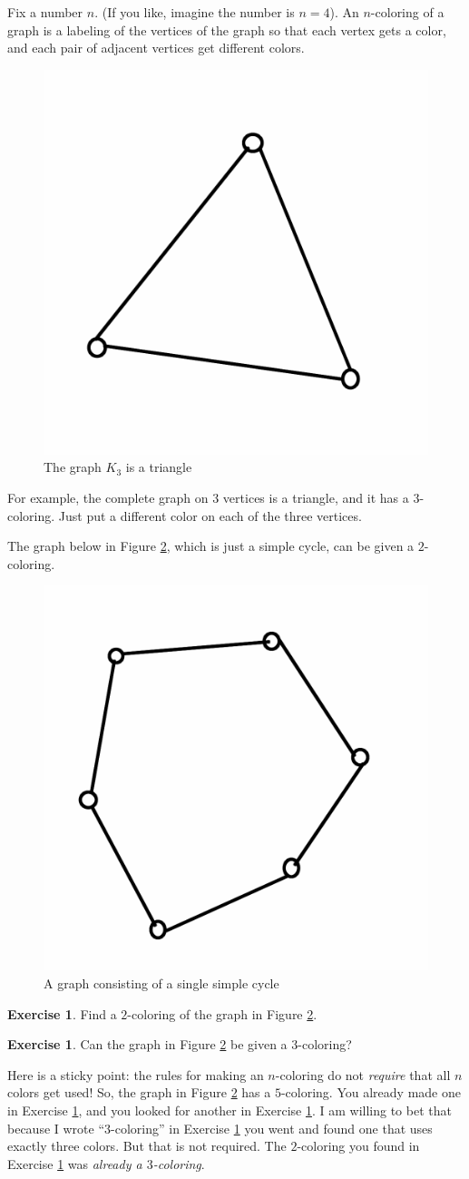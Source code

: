 \documentclass[12pt,letterpaper]{article}
\theoremstyle{definition}
\newtheorem{exercise}[question]{Exercise}
\begin{document}
Fix a number $n$. (If you like, imagine the number is $n=4$). An $n$-coloring of a graph is a labeling of the vertices
of the graph so that each vertex gets a color, and each pair of adjacent vertices get different colors.

\begin{figure}[h]
\centering
\includegraphics[width=.3\textwidth]{images/k3.png}
\caption{The graph $K_3$ is a triangle}
\label{fig:k3}
\end{figure}

For example, the complete graph on 3 vertices is a triangle, and it has a $3$-coloring. Just put a different color 
on each of the three vertices.

The graph below in Figure \ref{fig:cycle}, which is just a simple cycle, can be given a $2$-coloring.
\begin{figure}[h]
\centering
\includegraphics[width=.3\textwidth]{images/cycle.png}
\caption{A graph consisting of a single simple cycle}
\label{fig:cycle}
\end{figure}

\begin{exercise}\label{ex:2color}
Find a $2$-coloring of the graph in Figure \ref{fig:cycle}.
\end{exercise}

\begin{exercise}\label{ex:3color}
Can the graph in Figure \ref{fig:cycle} be given a $3$-coloring?
\end{exercise}

Here is a sticky point: the rules for making an $n$-coloring do not \emph{require} that all $n$ colors get used!
So, the graph in Figure \ref{fig:cycle} has a $5$-coloring. You already made one in Exercise \ref{ex:2color}, and 
you looked for another in Exercise \ref{ex:3color}. I am willing to bet that because I wrote ``$3$-coloring'' in
Exercise \ref{ex:3color} you went and found one that uses exactly three colors. But that is not required. The $2$-coloring you found in Exercise \ref{ex:2color} was \emph{already a $3$-coloring}.
\end{document}
